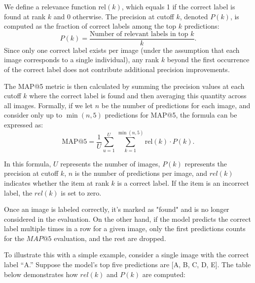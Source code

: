 \documentclass[twocolumn]{article}
\begin{document}
We define a relevance function \( \text{rel}(k) \), which equals 1 if the correct label is found at rank \( k \) and 0 otherwise. The precision at cutoff \( k \), denoted \( P(k) \), is computed as the fraction of correct labels among the top \( k \) predictions:
\[
P(k) = \frac{\text{Number of relevant labels in top } k}{k}.
\]
Since only one correct label exists per image (under the assumption that each image corresponds to a single individual), any rank \( k \) beyond the first occurrence of the correct label does not contribute additional precision improvements.

The MAP@5 metric is then calculated by summing the precision values at each cutoff \( k \) where the correct label is found and then averaging this quantity across all images. Formally, if we let \( n \) be the number of predictions for each image, and consider only up to \( \min(n, 5) \) predictions for MAP@5, the formula can be expressed as:
\[
\text{MAP@5} = \frac{1}{U} \sum_{u=1}^{U} \sum_{k=1}^{\min(n, 5)} \text{rel}(k) \cdot P(k).
\]

In this formula, \(U\) represents the number of images, \(P(k)\) represents the precision at cutoff \(k\), \(n\) is the number of predictions per image, and \(rel(k)\) indicates whether the item at rank \(k\) is a correct label. If the item is an incorrect label, the \(rel(k)\) is set to zero.

Once an image is labeled correctly, it's marked as "found" and is no longer considered in the evaluation. On the other hand, if the model predicts the correct label multiple times in a row for a given image, only the first predictions counts for the \(MAP@5\) evaluation, and the rest are dropped.

To illustrate this with a simple example, consider a single image with the correct label “A.” Suppose the model’s top five predictions are [A, B, C, D, E]. The table below demonstrates how \( rel(k) \) and \( P(k) \) are computed:

\begin{table}[ht!]
\centering
\renewcommand{\arraystretch}{1.5} %
\caption{Example computation of \( rel(k) \) and \( P(k) \) for an image with the correct label “A.” The first prediction is correct, so \( rel(k) \) is 1 for \( k = 1 \), and subsequent predictions contribute 0.}
\label{tab:map5_example}
\end{table}
\end{document}
